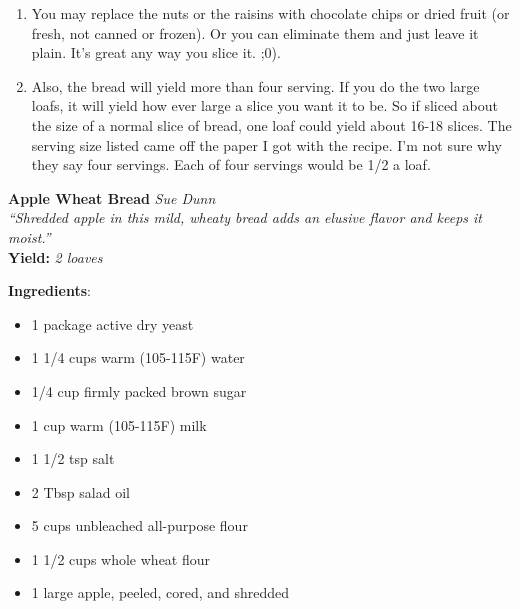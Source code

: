 \documentclass[11pt, twoside, openany]{book}
\begin{document}
\begin{minipage}[t]{\linewidth}
\begin{enumerate}
\item You may replace the nuts or the raisins with chocolate chips or dried fruit (or fresh, not canned or frozen). Or you can eliminate them and just leave it plain. It's great any way you slice it. ;0).
\item Also, the bread will yield more than four serving. If you do the two large loafs, it will yield how ever large a slice you want it to be. So if sliced about the size of a normal slice of bread, one loaf could yield about 16-18 slices. The serving size listed came off the paper I got with the recipe. I'm not sure why they say four servings. Each of four servings would be 1/2 a loaf.
\end{enumerate}
\end{minipage}\vspace{8mm}
\noindent\begin{minipage}[t]{\linewidth}%
{\Large\textbf{Apple Wheat Bread}} \label{apple-wheat-bread}\hfill\textit{Sue Dunn}\\
\textit{``Shredded apple in this mild, wheaty bread adds an elusive flavor and keeps it moist.''}\\
\textbf{Yield:} \textit{2 loaves}\\
\noindent\begin{minipage}[t]{0.78\linewidth}%
\textbf{Ingredients}:\vspace{-3mm}
\begin{multicols}{2}
\begin{itemize}\setlength\itemsep{-1mm}
\item 1 package active dry yeast
\item 1 1/4 cups warm (105-115F) water
\item 1/4 cup firmly packed brown sugar
\item 1 cup warm (105-115F) milk
\item 1 1/2 tsp salt
\item 2 Tbsp salad oil
\item 5 cups unbleached all-purpose flour
\item 1 1/2 cups whole wheat flour
\item 1 large apple, peeled, cored, and shredded
\end{itemize}
\end{multicols}
\end{minipage}
\noindent\begin{minipage}[t]{0.18\linewidth}
\centering \strut\vspace*{-\baselineskip}\newline

\end{minipage}
\end{minipage}
\end{document}
